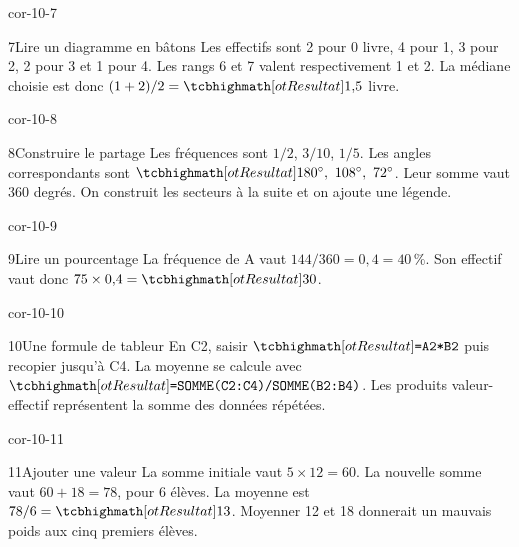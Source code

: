 \begin{blocLivre}{cor-10-7}\begin{corrige}{7}{Lire un diagramme en bâtons}
Les effectifs sont 2 pour 0 livre, 4 pour 1, 3 pour 2, 2 pour 3 et 1 pour 4. Les rangs 6 et 7 valent respectivement 1 et 2. La médiane choisie est donc $(1+2)/2=\res{1{,}5}$ livre.
\label{fig-cor-10-7}
\end{corrige}\end{blocLivre}
\begin{blocLivre}{cor-10-8}\begin{corrige}{8}{Construire le partage}
Les fréquences sont $1/2$, $3/10$, $1/5$. Les angles correspondants sont $\res{180^\circ,\ 108^\circ,\ 72^\circ}$. Leur somme vaut 360 degrés. On construit les secteurs à la suite et on ajoute une légende.
\label{fig-cor-10-8}
\end{corrige}\end{blocLivre}
\begin{blocLivre}{cor-10-9}\begin{corrige}{9}{Lire un pourcentage}
La fréquence de A vaut $144/360=0{,}4=40\,\%$. Son effectif vaut donc $75\times0{,}4=\res{30}$.
\label{fig-cor-10-9}
\end{corrige}\end{blocLivre}
\begin{blocLivre}{cor-10-10}\begin{corrige}{10}{Une formule de tableur}
En C2, saisir $\res{\texttt{=A2*B2}}$ puis recopier jusqu’à C4. La moyenne se calcule avec $\res{\texttt{=SOMME(C2:C4)/SOMME(B2:B4)}}$. Les produits valeur-effectif représentent la somme des données répétées.
\end{corrige}\end{blocLivre}
\begin{blocLivre}{cor-10-11}\begin{corrige}{11}{Ajouter une valeur}
La somme initiale vaut $5\times12=60$. La nouvelle somme vaut $60+18=78$, pour 6 élèves. La moyenne est $78/6=\res{13}$. Moyenner 12 et 18 donnerait un mauvais poids aux cinq premiers élèves.
\end{corrige}\end{blocLivre}
